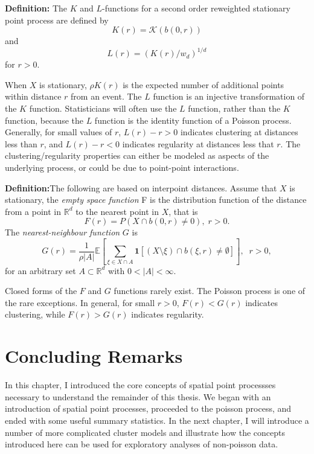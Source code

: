 \documentclass[12pt,twoside]{reedthesis}
\begin{document}
  \textbf{Definition:} The \(K\) and \(L\)-functions for a second order
  reweighted stationary point process are defined by
  \[ K(r) = \mathcal{K}(b(0, r)) \] and \[ L(r) = (K(r)/w_d)^{1/d} \] for
  \(r >0\).
  
  When \(X\) is stationary, \(\rho K(r)\) is the expected number of
  additional points within distance \(r\) from an event. The \(L\)
  function is an injective transformation of the \(K\) function.
  Statisticians will often use the \(L\) function, rather than the \(K\)
  function, because the \(L\) function is the identity function of a
  Poisson process. Generally, for small values of \(r\), \(L(r) - r >0\)
  indicates clustering at distances less than \(r\), and \(L(r) - r < 0\)
  indicates regularity at distances less that \(r\). The
  clustering/regularity properties can either be modeled as aspects of the
  underlying process, or could be due to point-point interactions.
  
  \textbf{Definition:}The following are based on interpoint distances.
  Assume that \(X\) is stationary, the \emph{empty space function} F is
  the distribution function of the distance from a point in
  \(\mathbb{R}^d\) to the nearest point in \(X\), that is
  \[ F(r) = P(X\cap b(0, r)\neq 0), \; r > 0.\] The
  \emph{nearest-neighbour function} \(G\) is
  \[G(r) = \frac{1}{\rho |A|} \mathbb{E} [ \sum_{\xi \in X\cap A} \mathbf{1}[(X\setminus \xi) \cap b(\xi, r) \neq \emptyset]], \; \; r > 0, \]
  for an arbitrary set \(A \subset \mathbb{R}^d\) with
  \(0 < |A| < \infty\).
  
  Closed forms of the \(F\) and \(G\) functions rarely exist. The Poisson
  process is one of the rare exceptions. In general, for small \(r > 0\),
  \(F(r) < G(r)\) indicates clustering, while \(F(r) > G(r)\) indicates
  regularity.
  
  \section{Concluding Remarks}\label{concluding-remarks}
  
  In this chapter, I introduced the core concepts of spatial point
  processses necessary to understand the remainder of this thesis. We
  began with an introduction of spatial point processes, proceeded to the
  poisson process, and ended with some useful summary statistics. In the
  next chapter, I will introduce a number of more complicated cluster
  models and illustrate how the concepts introduced here can be used for
  exploratory analyses of non-poisson data.
  
\end{document}
